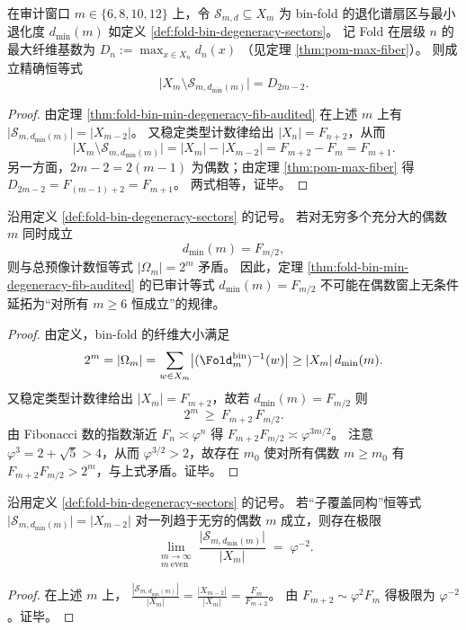 \begin{corollary}\label{cor:fold-bin-minsector-complement-maxfiber-audited}
在审计窗口 \(m\in\{6,8,10,12\}\) 上，令 \(\mathcal{S}_{m,d}\subseteq X_m\) 为 bin-fold 的退化谱扇区与最小退化度 \(d_{\min}(m)\) 如定义 \ref{def:fold-bin-degeneracy-sectors}。
记 Fold 在层级 \(n\) 的最大纤维基数为
\(
D_n:=\max_{x\in X_n} d_n(x)
\)
（见定理 \ref{thm:pom-max-fiber}）。
则成立精确恒等式
\[
\bigl|X_m\setminus \mathcal{S}_{m,d_{\min}(m)}\bigr| = D_{2m-2}.
\]
\end{corollary}
\begin{proof}
由定理 \ref{thm:fold-bin-min-degeneracy-fib-audited} 在上述 \(m\) 上有 \(\bigl|\mathcal{S}_{m,d_{\min}(m)}\bigr|=|X_{m-2}|\)。
又稳定类型计数律给出 \(|X_n|=F_{n+2}\)，从而
\[
\bigl|X_m\setminus \mathcal{S}_{m,d_{\min}(m)}\bigr|
=|X_m|-|X_{m-2}|
=F_{m+2}-F_m
=F_{m+1}.
\]
另一方面，\(2m-2=2(m-1)\) 为偶数；由定理 \ref{thm:pom-max-fiber} 得
\(
D_{2m-2}=F_{(m-1)+2}=F_{m+1}
\)。
两式相等，证毕。
\end{proof}

\begin{corollary}\label{cor:fold-bin-min-degeneracy-fib-nonpersistent}
沿用定义 \ref{def:fold-bin-degeneracy-sectors} 的记号。
若对无穷多个充分大的偶数 \(m\) 同时成立
\[
d_{\min}(m)=F_{m/2},
\]
则与总预像计数恒等式 \(|\Omega_m|=2^m\) 矛盾。
因此，定理 \ref{thm:fold-bin-min-degeneracy-fib-audited} 的已审计等式 \(d_{\min}(m)=F_{m/2}\) 不可能在偶数窗上无条件延拓为“对所有 \(m\ge 6\) 恒成立”的规律。
\end{corollary}
\begin{proof}
由定义，bin-fold 的纤维大小满足
\[
2^m
=|\Omega_m|
=\sum_{w\in X_m}\bigl|(\Fold_m^{\mathrm{bin}})^{-1}(w)\bigr|
\ge |X_m|\,d_{\min}(m).
\]
又稳定类型计数律给出 \(|X_m|=F_{m+2}\)，故若 \(d_{\min}(m)=F_{m/2}\) 则
\[
2^m\ \ge\ F_{m+2}\,F_{m/2}.
\]
由 Fibonacci 数的指数渐近 \(F_n\asymp \varphi^n\) 得 \(F_{m+2}F_{m/2}\asymp \varphi^{3m/2}\)。
注意 \(\varphi^3=2+\sqrt5>4\)，从而 \(\varphi^{3/2}>2\)，故存在 \(m_0\) 使对所有偶数 \(m\ge m_0\) 有 \(F_{m+2}F_{m/2}>2^m\)，与上式矛盾。证毕。
\end{proof}

\begin{corollary}[子覆盖同构外推下的最小扇区密度极限]\label{cor:fold-bin-minsector-density-phi-minus2}
沿用定义 \ref{def:fold-bin-degeneracy-sectors} 的记号。
若“子覆盖同构”恒等式
\(
\bigl|\mathcal{S}_{m,d_{\min}(m)}\bigr|=|X_{m-2}|
\)
对一列趋于无穷的偶数 \(m\) 成立，则存在极限
\[
\lim_{\substack{m\to\infty\\ m\ \mathrm{even}}}
\frac{\bigl|\mathcal{S}_{m,d_{\min}(m)}\bigr|}{|X_m|}
\;=\;
\varphi^{-2}.
\]
\end{corollary}
\begin{proof}
在上述 \(m\) 上，
\(
\frac{|\mathcal{S}_{m,d_{\min}(m)}|}{|X_m|}=\frac{|X_{m-2}|}{|X_m|}=\frac{F_m}{F_{m+2}}
\)。
由 \(F_{m+2}\sim \varphi^2 F_m\) 得极限为 \(\varphi^{-2}\)。证毕。
\end{proof}

